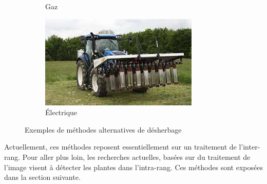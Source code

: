 \documentclass[../thesis.tex]{subfiles}
\begin{document}
\begin{figure}[H]
\begin{subfigure}{0.31\linewidth}
            \caption{Gaz}
        \end{subfigure}
        \hfill
        \begin{subfigure}{0.31\linewidth}
            \centering
            \includegraphics[width=\linewidth]{img/intro/traitement-electrique}
            \caption{Électrique}
        \end{subfigure}
        \caption{Exemples de méthodes alternatives de désherbage}
        \label{fig:02-traitement-alternatives}
    \end{figure}
    
    Actuellement, ces méthodes reposent essentiellement sur un traitement de l'inter-rang. Pour aller plus loin, les recherches actuelles, basées sur du traitement de l'image visent à détecter les plantes dans l'intra-rang. Ces méthodes sont exposées dans la section suivante.
    
    \newpage
    
\end{document}
